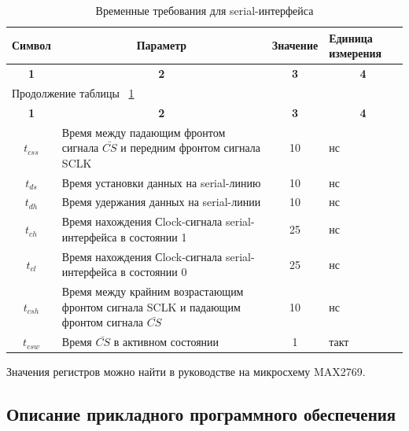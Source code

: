 \begin{center}
\begin{longtable}{|c|p{250pt}|c|p{70pt}|}
\caption{Временные требования для serial-интерфейса} \label{tab:gps_serial} \\ \hline
\multicolumn{1}{|c|}{\textbf{Символ}}    &   \multicolumn{1}{c|}{\textbf{Параметр}} & 
\multicolumn{1}{|c|}{\textbf{Значение}}    &   \multicolumn{1}{p{70pt}|}{\textbf{Единица измерения}} \\ \hline

\multicolumn{1}{|c|}{\textbf{1}}    &   \multicolumn{1}{|c|}{\textbf{2}} &
\multicolumn{1}{|c|}{\textbf{3}}    &   \multicolumn{1}{|c|}{\textbf{4}} \\ \hline
\endfirsthead

\multicolumn{2}{|l|}{{Продолжение таблицы ~\ref{tab:gps_serial}}} \\ %
\hline
\multicolumn{1}{|c|}{\textbf{1}}    &   \multicolumn{1}{|c|}{\textbf{2}} &
\multicolumn{1}{|c|}{\textbf{3}}    &   \multicolumn{1}{|c|}{\textbf{4}} \\ \hline
\endhead
\endfoot
 \hline  
  $t_{css}$  & Время между падающим фронтом сигнала $\bar {CS}$ и передним фронтом сигнала SCLK	& 10 & нс  \\  
 \hline  
  $t_{ds}$   & Время установки данных на serial-линию	& 10 & нс \\  
 \hline  
  $t_{dh}$   & Время удержания данных на serial-линии	& 10 & нс \\  
 \hline  
  $t_{ch}$   & Время нахождения Сlock-сигнала serial-интерфейса в состоянии 1 & 25 & нс \\  
 \hline  
  $t_{cl}$   & Время нахождения Сlock-сигнала serial-интерфейса в состоянии 0 & 25 & нс \\  
 \hline  
  $t_{csh}$  & Время между крайним возрастающим фронтом сигнала SCLK и падающим фронтом сигнала $\bar {CS}$ & 10 & нс \\  
 \hline  
  $t_{csw}$  & Время $\bar {CS}$ в активном состоянии    & 1 & такт \\  
 \hline  
\end{longtable}
\end{center}

Значения регистров можно найти в руководстве на микросхему MAX2769.

\subsection{Описание прикладного программного обеспечения}
